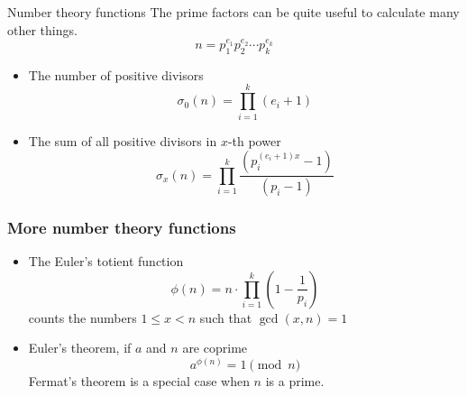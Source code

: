 \documentclass{beamer}
\begin{document}
\begin{frame}[plain]{Number theory functions}
  \vspace{20pt}
  The prime factors can be quite useful to calculate many other things.
  \[
    n = p_1^{e_1}p_2^{e_2}\cdots p_k^{e_k}
  \]
  \begin{itemize}
    \item The number of positive divisors
    \[
      \sigma_0(n) = \prod_{i=1}^k (e_i + 1)
    \]
    \item The sum of all positive divisors in $x$-th power
    \[
      \sigma_x(n) = \prod_{i=1}^k \frac{(p_i^{(e_i + 1)x} - 1)}{(p_i-1)}
    \]
  \end{itemize}
\end{frame}

\begin{frame}[plain]
  \frametitle{More number theory functions}
  \vspace{20pt}
  \begin{itemize}
    \item The Euler's totient function
      \[
      \phi(n) = n \cdot \prod_{i=1}^{k} \left(1 - \frac{1}{p_i}\right)
      \]
      counts the numbers $1\leq x < n$ such that $\gcd(x,n)=1$
    \item Euler's theorem, if $a$ and $n$ are coprime
      \[
        a^{\phi(n)} = 1 \pmod{n}
      \]
      Fermat's theorem is a special case when $n$ is a prime.
  \end{itemize}
\end{frame}
\end{document}
